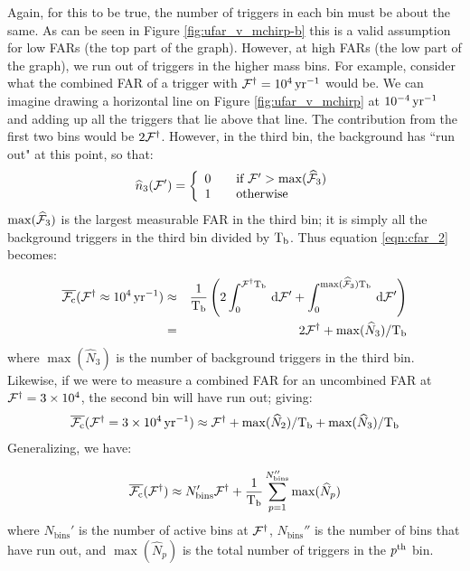 Again, for this to be true, the number of triggers in each bin must be about the same. As can be seen in Figure \ref{fig:ufar_v_mchirp-b} this is a valid assumption for low \acp{FAR} (the top part of the graph). However, at high \acp{FAR} (the low part of the graph), we run out of triggers in the higher mass bins. For example, consider what the combined \ac{FAR} of a trigger with $\mathcal{F}^\dagger = 10^4 \,\mathrm{yr}^{-1}$ would be. We can imagine drawing a horizontal line on Figure \ref{fig:ufar_v_mchirp} at $10^{-4} \,\mathrm{yr}^{-1}$ and adding up all the triggers that lie above that line. The contribution from the first two bins would be $2\mathcal{F}^\dagger$. However, in the third bin, the background has ``run out" at this point, so that:
\begin{equation}
\widehat{n}_3( \mathcal{F}' ) = \left\{ \begin{array}{l l}
    0 & \quad \mbox{if $\mathcal{F}' > \max(\widehat{\mathcal{F}}_3)$} \\
    1 & \quad \mbox{otherwise}\\ \end{array} \right.
\end{equation}
$\max(\widehat{\mathcal{F}}_3)$ is the largest measurable \ac{FAR} in the third bin; it is simply all the background triggers in the third bin divided by $\mathrm{T_b}$. Thus equation \ref{eqn:cfar_2} becomes:

\begin{eqnarray}
\label{eqn:cfar_4}
\overline{\cfar}(\far^\dagger \approx 10^{4}\yr^{-1}) & \approx & \frac{1}{\Tb} \left( 2 \int_{0}^{\far^\dagger \Tb} \d \far' + \int_{0}^{\max(\widehat{\far}_3) \Tb} \d \far' \right) \nonumber \\
 & = & 2 \far^\dagger + \max(\widehat{N}_3)/\Tb
\end{eqnarray}
where $\max(\widehat{N}_3)$ is the number of background triggers in the third bin. Likewise, if we were to measure a combined \ac{FAR} for an uncombined \ac{FAR} at $\mathcal{F}^\dagger = 3 \times 10^{4}$, the second bin will have run out; giving:
\begin{eqnarray}
\overline{\mathcal{F}_{\mathrm{c}}}(\mathcal{F}^\dagger = 3\times 10^{4}\,\mathrm{yr}^{-1}) \approx \mathcal{F}^\dagger + \max(\widehat{N}_2)/\mathrm{T_b} + \max(\widehat{N}_3)/\mathrm{T_b}
\end{eqnarray}
Generalizing, we have:

\begin{equation}
\label{eqn:cfar_alt}
\overline{\cfar}(\far^\dagger) \approx N_{\mathrm{bins}}' \far^\dagger + \frac{1}{\Tb} \sum_{p=1}^{N_{\mathrm{bins}}''} \max(\widehat{N}_p)
\end{equation}
where $N_{\mathrm{bins}}'$ is the number of active bins at $\mathcal{F}^\dagger$, $N_{\mathrm{bins}}''$ is the number of bins that have run out, and $\max(\widehat{N}_p)$ is the total number of triggers in the $p^{\mathrm{th}}$ bin. 

